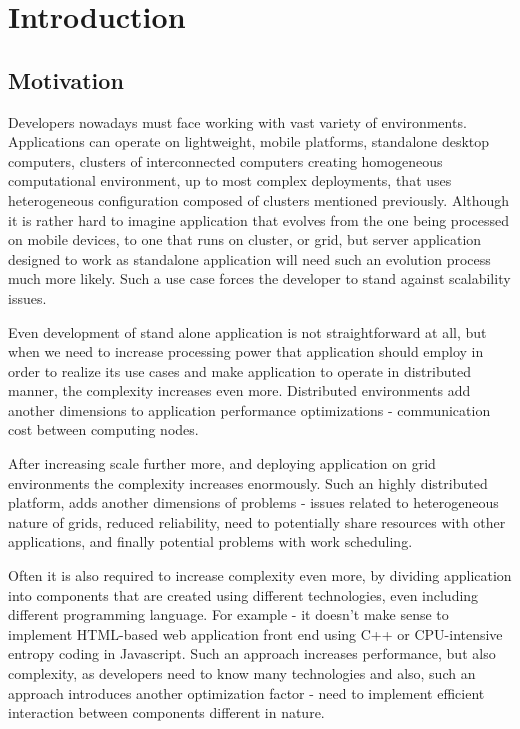 %


\chapter{Introduction}
\label{cha:intro}


\section{Motivation}
\label{ch1:Motivation}

Developers nowadays must face working with vast variety of environments. Applications can operate on lightweight, mobile platforms, standalone desktop computers, clusters of interconnected computers creating homogeneous computational environment, up to most complex deployments, that uses heterogeneous configuration composed of clusters mentioned previously. Although it is rather hard to imagine application  that evolves from the one being processed on mobile devices, to one that runs on cluster, or grid, but server application designed to work as standalone application will need such an evolution process much more likely. Such a use case forces the developer to stand against scalability issues.

Even development of stand alone application is not straightforward at all, but when we need to increase processing power that application should employ in order to realize its use cases and make application to operate in distributed manner, the complexity increases even more. Distributed environments add another dimensions to application performance optimizations - communication cost between computing nodes.

After increasing scale further more, and deploying application on grid environments the complexity increases enormously. Such an highly distributed platform, adds another dimensions of problems - issues related to heterogeneous nature of grids, reduced reliability, need to potentially share resources with other applications, and finally potential problems with work scheduling.

Often it is also required to increase complexity even more, by dividing application into components that are created using different technologies, even including different programming language. For example - it doesn\rq{}t make sense to implement HTML-based web application front end using C++ or CPU-intensive entropy coding in Javascript. Such an approach increases performance, but also complexity, as developers need to know many technologies and also, such an approach introduces another optimization factor - need to implement efficient interaction between components different in nature.





